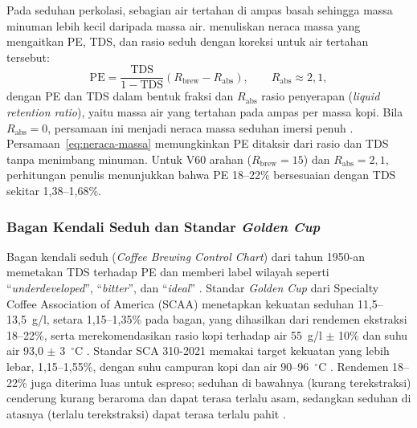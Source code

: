 Pada seduhan perkolasi, sebagian air tertahan di ampas basah sehingga massa minuman lebih kecil daripada massa air. \citet{guinard2023new} menuliskan neraca massa yang mengaitkan PE, TDS, dan rasio seduh dengan koreksi untuk air tertahan tersebut:
\begin{equation}
\mathrm{PE} = \frac{\mathrm{TDS}}{1 - \mathrm{TDS}}\left(R_{\mathrm{brew}} - R_{\mathrm{abs}}\right), \qquad R_{\mathrm{abs}} \approx 2{,}1,
\label{eq:neraca-massa}
\end{equation}
dengan PE dan TDS dalam bentuk fraksi dan $R_{\mathrm{abs}}$ rasio penyerapan (\textit{liquid retention ratio}), yaitu massa air yang tertahan pada ampas per massa kopi. Bila $R_{\mathrm{abs}} = 0$, persamaan ini menjadi neraca massa seduhan imersi penuh \citep*{liang2021equilibrium}. Persamaan~\eqref{eq:neraca-massa} memungkinkan PE ditaksir dari rasio dan TDS tanpa menimbang minuman. Untuk V60 arahan ($R_{\mathrm{brew}} = 15$) dan $R_{\mathrm{abs}} = 2{,}1$, perhitungan penulis menunjukkan bahwa PE 18--22\% bersesuaian dengan TDS sekitar 1,38--1,68\%.

\subsubsection{Bagan Kendali Seduh dan Standar \texorpdfstring{\textit{Golden Cup}}{Golden Cup}}
\label{subsubsec:bagan-kendali}

Bagan kendali seduh (\textit{Coffee Brewing Control Chart}) dari tahun 1950-an memetakan TDS terhadap PE dan memberi label wilayah seperti ``\textit{underdeveloped}'', ``\textit{bitter}'', dan ``\textit{ideal}'' \citep*{frost2020effects}. Standar \textit{Golden Cup} dari Specialty Coffee Association of America (SCAA) menetapkan kekuatan seduhan 11,5--13,5~g/l, setara 1,15--1,35\% pada bagan, yang dihasilkan dari rendemen ekstraksi 18--22\%, serta merekomendasikan rasio kopi terhadap air 55~g/l $\pm$ 10\% dan suhu air 93,0 $\pm$ 3~$^\circ$C \citep*{scaa2015golden}. Standar SCA 310-2021 memakai target kekuatan yang lebih lebar, 1,15--1,55\%, dengan suhu campuran kopi dan air 90--96~$^\circ$C \citep*{sca2022home}. Rendemen 18--22\% juga diterima luas untuk espreso; seduhan di bawahnya (kurang terekstraksi) cenderung kurang beraroma dan dapat terasa terlalu asam, sedangkan seduhan di atasnya (terlalu terekstraksi) dapat terasa terlalu pahit \citep{moroney2019analysing}.

